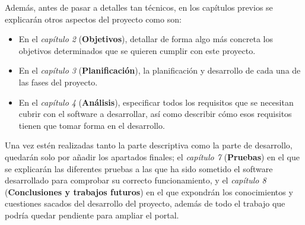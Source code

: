 \bigskip
Además, antes de pasar a detalles tan técnicos, en los capítulos previos se explicarán otros aspectos del proyecto como son:

\begin{itemize}
  \item En el \textit{capítulo 2} (\textbf{Objetivos}), detallar de forma algo más concreta los objetivos determinados que se quieren cumplir con este proyecto.
  \item En el \textit{capítulo 3} (\textbf{Planificación}), la planificación y desarrollo de cada una de las fases del proyecto.
  \item En el \textit{capítulo 4} (\textbf{Análisis}), especificar todos los requisitos que se necesitan cubrir con el software a desarrollar, así como describir cómo esos requisitos tienen que tomar forma en el desarrollo.
\end{itemize}

\bigskip
Una vez estén realizadas tanto la parte descriptiva como la parte de desarrollo, quedarán solo por añadir los apartados finales; el \textit{capítulo 7} (\textbf{Pruebas}) en el que se explicarán las diferentes pruebas a las que ha sido sometido el software desarrollado para comprobar su correcto funcionamiento, y el \textit{capítulo 8} (\textbf{Conclusiones y trabajos futuros}) en el que expondrán los conocimientos y cuestiones sacados del desarrollo del proyecto, además de todo el trabajo que podría quedar pendiente para ampliar el portal.

